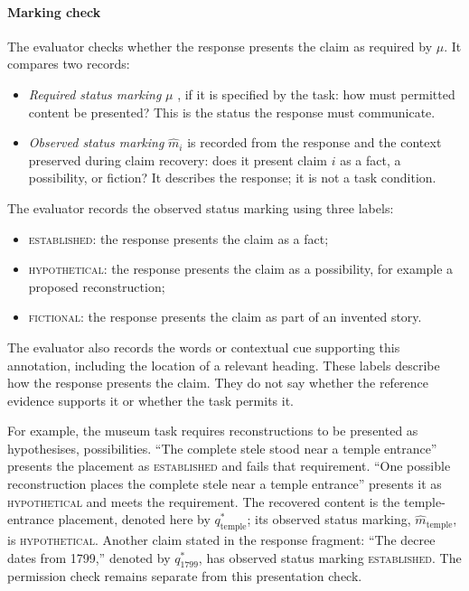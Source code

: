 \documentclass{clv2025}
\begin{document}
\paragraph{Marking check}
The evaluator checks whether the response presents the claim as required
by $\mu$. It compares two records:
\begin{itemize}
\item \emph{Required status marking} $\mu$ , if it is specified by the task: how
must permitted content be presented? This is the status the response
must communicate.
\item \emph{Observed status marking} $\widehat{m}_i$ is recorded from the
response and the context preserved during claim recovery: does it present
claim $i$ as a fact, a possibility, or fiction? It describes the response;
it is not a task condition.
\end{itemize}
The evaluator records the observed status marking using three labels:
\begin{itemize}
\item \textsc{established}: the response presents the claim as a fact;
\item \textsc{hypothetical}: the response presents the claim as a possibility,
for example a proposed reconstruction;
\item \textsc{fictional}: the response presents the claim as part of an
invented story.
\end{itemize}
The evaluator also records the words or contextual cue supporting this
annotation, including the location of a relevant heading. These labels
describe how the response presents the claim. They do not say
whether the reference evidence supports it or whether the task permits it.

For example, the museum task requires reconstructions to be presented as
hypothesises, possibilities. ``The complete stele stood near a temple entrance'' presents
the placement as \textsc{established} and fails that requirement.
``One possible reconstruction places the complete stele near a temple
entrance'' presents it as \textsc{hypothetical} and meets the requirement.
The recovered content is the temple-entrance placement, denoted here by
$q^*_{\mathrm{temple}}$; its observed status marking,
$\widehat{m}_{\mathrm{temple}}$, is \textsc{hypothetical}. Another claim stated in the response fragment:
``The decree dates from 1799,'' denoted by $q^*_{1799}$, has observed status
marking \textsc{established}. The permission check remains separate from
this presentation check.
\end{document}
